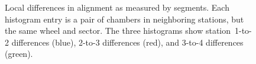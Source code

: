 \begin{figure}
  \centering
  \caption{Local differences in alignment as measured by segments.  Each histogram entry is a pair of chambers in neighboring stations, but the same wheel and sector.  The three histograms show station~1-to-2 differences (blue), 2-to-3 differences (red), and 3-to-4 differences (green).  \label{fig:valid_NOMvsMPvsHIP}}
\end{figure}
 
